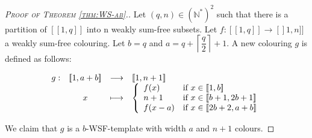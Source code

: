 \begin{proof}[\textsc{Proof of Theorem \ref{thm:WS-ab}.}]
\label{PreuveThm}
Let \((q, n) \in (\mathbb{N}^*)^2\) such that there is a partition of \([\![1, q]\!]\) into n weakly sum-free subsets. 
Let \(f: [\![1, q]\!] \rightarrow [\!]1, n]\!]\) a weakly sum-free colouring.
Let \(b=q\) and \(a = q + \left \lceil \dfrac{q}{2} \right \rceil + 1\). A new colouring \(g\) is defined as follows:

\[
\begin{array}{c c c l}
	g : & [\![1, a + b]\!] & \longrightarrow & [\![1, n + 1]\!] \\
	& x & \longmapsto &
		\left\{ \begin{array}{l l}
			f(x) & \text{if}~x \in [\![1, b]\!]  \\
			n + 1 & \text{if}~x \in [\![b + 1, 2 b + 1]\!] \\
			f(x - a) & \text{if}~x \in  [\![2 b + 2, a + b]\!]
		\end{array} \right.
\end{array}
\]

We claim that \(g\) is a \(b\)-WSF-template with width \(a\) and \(n + 1\) colours.


\end{proof}
